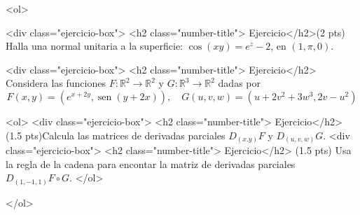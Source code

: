 \documentclass[12pt]{article}
\newcommand{\sen}{\operatorname{sen}}
\begin{document}
\bigskip

            
\bigskip
\bigskip
\bigskip


<ol>

  
<div class="ejercicio-box"> <h2 class="number-title"> Ejercicio</h2>(2 pts) Halla una normal unitaria a la superficie: $\cos(xy)=e^z-2$, en $(1,\pi,0)$.
 


  \vspace{3cm}

<div class="ejercicio-box"> <h2 class="number-title"> Ejercicio</h2> Considera las funciones $F:\mathbb{R}^2 \to \mathbb{R}^2$ y $G:\mathbb{R}^3 \to \mathbb{R}^2$
  dadas por
  $$
  F(x,y)=(e^{x+2y}, \sen(y+2x)), \quad G(u,v,w)=(u+2v^2+3w^3, 2v-u^2)
  $$

  <ol>
  <div class="ejercicio-box"> <h2 class="number-title"> Ejercicio</h2> (1.5 pts)Calcula las matrices de derivadas parciales $D_{(x.y)}F$ y $D_{(u,v,w)}G$.
  <div class="ejercicio-box"> <h2 class="number-title"> Ejercicio</h2> (1.5 pts)  Usa la regla de la cadena para encontar la matriz de derivadas
    parciales  $D_{(1,-1,1)}F\circ G$.
  </ol>
  
</ol>


  
\end{document}
